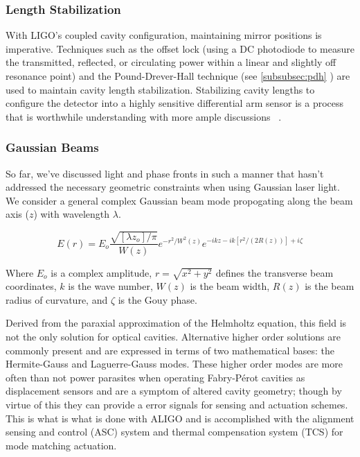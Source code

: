 \subsubsection{Length Stabilization}
With LIGO's coupled cavity configuration, maintaining mirror positions is imperative. Techniques such as the offset lock (using a DC photodiode to measure the transmitted, reflected, or circulating power within a linear and slightly off resonance point) \cite{} and the Pound-Drever-Hall technique (see \ref{subsubsec:pdh} ) are used to maintain cavity length stabilization. Stabilizing cavity lengths to configure the detector into a highly sensitive differential arm sensor is a process that is worthwhile understanding with more ample discussions ~\cite{Mullavey:12}.

\subsubsection{Gaussian Beams}
So far, we've discussed light and phase fronts in such a manner that hasn't addressed the necessary geometric constraints when using Gaussian laser light. We consider a general complex Gaussian beam mode propogating along the beam axis ($z$) with wavelength $\lambda$.

\begin{equation}\label{eq:gaussian_beam}
E(r) = E_o \frac{\sqrt{[\lambda z_o] / \pi}}{W(z)}e^{-r^2 / W^2(z)} e^{-ikz - ik[r^2 / (2R(z))] + i \zeta}
\end{equation}

Where $E_o$ is a complex amplitude, $r = \sqrt{x^2 + y^2}$ defines the transverse beam coordinates, $k$ is the wave number, $W(z)$ is the beam width, $R(z)$ is the beam radius of curvature, and $\zeta$ is the Gouy phase.

Derived from the paraxial approximation of the Helmholtz equation, this field is not the only solution for optical cavities. Alternative higher order solutions are commonly present and are expressed in terms of two mathematical bases: the Hermite-Gauss and Laguerre-Gauss modes. These higher order modes are more often than not power parasites when operating Fabry-P\'{e}rot cavities as displacement sensors and are a symptom of altered cavity geometry; though by virtue of this they can provide a error signals for sensing and actuation schemes. This is what is what is done with ALIGO and is accomplished with the alignment sensing and control (ASC) system and thermal compensation system (TCS) for mode matching actuation.

